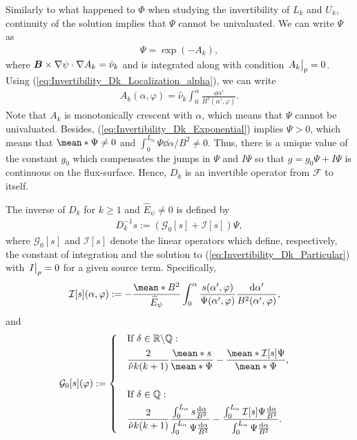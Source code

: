 \documentclass[10pt]{iopart}
\begin{document}
Similarly to what happened to $\Phi$ when studying the invertibility of $L_k$ and $U_k$, continuity of the solution implies that $\Psi$ cannot be univaluated. We can write $\Psi$ as
%
\begin{align}
	\Psi = \exp(-A_k), 
	\label{eq:Invertibility_Dk_Exponential}
\end{align}
where $\vb*{B}\times \nabla\psi \cdot \nabla A_k = \hat{\nu}_k$ and is integrated along with condition $\eval{A_k}_{p}=0$. Using (\ref{eq:Invertibility_Dk_Localization_alpha}), we can write
%
\begin{align}
	A_k(\alpha,\varphi) = \hat{\nu}_k \int_{0}^{\alpha} \frac{\dd{\alpha'}}{ B^2(\alpha',\varphi)}.
\end{align}
Note that $A_k$ is monotonically crescent with $\alpha$, which means that $\Psi $ cannot be univaluated. Besides, (\ref{eq:Invertibility_Dk_Exponential}) implies $\Psi>0$, which means that $\mean*{\Psi}\ne 0 $ and $\int_{0}^{L_\alpha}\Psi   \dd{\alpha}/  B^2 \ne 0 $. Thus, there is a unique value of the constant $g_0$ which compensates the jumps in $\Psi$ and $I\Psi$ so that $g=g_0 \Psi + I \Psi$ is continuous on the flux-surface. Hence, $D_k$ is an invertible operator from $\mathcal{F}$ to itself. 


The inverse of $D_k$ for $k \ge 1$ and $\widehat{E}_\psi \ne 0$ is defined by
%
\begin{align}
	D_k^{-1} s :=  ( \mathcal{G}_0[s] + \mathcal{I}[s] ) \Psi,
\end{align}
where $\mathcal{G}_0[s]$ and $\mathcal{I}[s]$ denote the linear operators which define, respectively, the constant of integration and the solution to (\ref{eq:Invertibility_Dk_Particular}) with $\eval{I}_{p}=0$ for a given source term. Specifically,
%
\begin{align}
	\mathcal{I}[s](\alpha,\varphi)
	& :=
	- \frac{\mean*{B^2}}{\widehat{E}_\psi}
	\int_{0}^{\alpha}
	\frac{s(\alpha',\varphi)}{\Psi(\alpha',\varphi)}
	\frac{\dd{\alpha'}}{ B^2(\alpha',\varphi)}  ,
\end{align}
and
\begin{align}
	\mathcal{G}_0[s](\varphi)
	& :=
	\begin{dcases}
		& \text{If }\delta\in\mathbb{R}\backslash\mathbb{Q}:\\
		& \frac{2}{ \hat{\nu} k (k+1) } \frac{\mean*{s}}{\mean*{\Psi} }
		- 
		\frac{\mean*{\mathcal{I}[s] \Psi}}{\mean*{\Psi} },  
		\vspace{0.5cm} \\ 
		& \text{If }\delta\in\mathbb{Q}:\\
		& \frac{2}{\hat{\nu} k(k+1)} \dfrac{\int_{0}^{L_\alpha} s \frac{\dd{\alpha}}{ B^2 }}{\int_{0}^{L_\alpha} \Psi\frac{\dd{\alpha}}{ B^2 }}
		-      
		\dfrac{\int_{0}^{L_\alpha}   \mathcal{I}[s] \Psi  \frac{\dd{\alpha}}{ B^2 }}{\int_{0}^{L_\alpha} \Psi\frac{\dd{\alpha}}{ B^2 }} .
	\end{dcases}  
\end{align}
\end{document}
